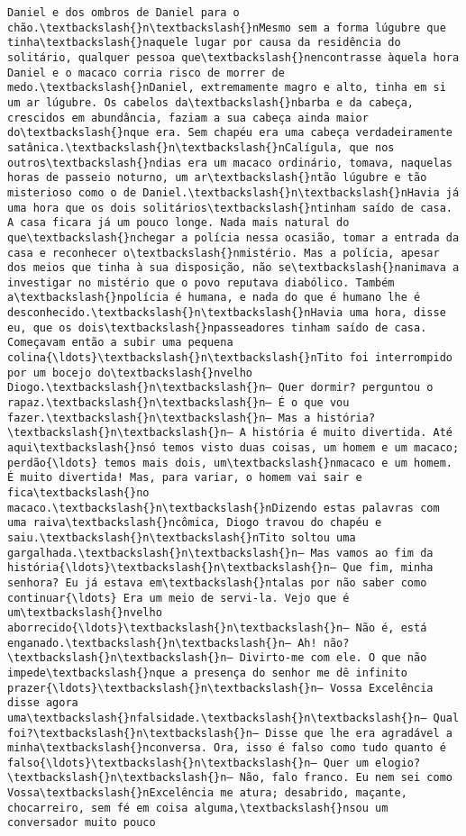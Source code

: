 \documentclass[11pt]{article}
\begin{document}
\begin{Verbatim}[commandchars=\\\{\}]
Daniel e dos ombros de Daniel para o chão.\textbackslash{}n\textbackslash{}nMesmo sem a forma lúgubre que tinha\textbackslash{}naquele lugar por causa da residência do solitário, qualquer pessoa que\textbackslash{}nencontrasse àquela hora Daniel e o macaco corria risco de morrer de medo.\textbackslash{}nDaniel, extremamente magro e alto, tinha em si um ar lúgubre. Os cabelos da\textbackslash{}nbarba e da cabeça, crescidos em abundância, faziam a sua cabeça ainda maior do\textbackslash{}nque era. Sem chapéu era uma cabeça verdadeiramente satânica.\textbackslash{}n\textbackslash{}nCalígula, que nos outros\textbackslash{}ndias era um macaco ordinário, tomava, naquelas horas de passeio noturno, um ar\textbackslash{}ntão lúgubre e tão misterioso como o de Daniel.\textbackslash{}n\textbackslash{}nHavia já uma hora que os dois solitários\textbackslash{}ntinham saído de casa. A casa ficara já um pouco longe. Nada mais natural do que\textbackslash{}nchegar a polícia nessa ocasião, tomar a entrada da casa e reconhecer o\textbackslash{}nmistério. Mas a polícia, apesar dos meios que tinha à sua disposição, não se\textbackslash{}nanimava a investigar no mistério que o povo reputava diabólico. Também a\textbackslash{}npolícia é humana, e nada do que é humano lhe é desconhecido.\textbackslash{}n\textbackslash{}nHavia uma hora, disse eu, que os dois\textbackslash{}npasseadores tinham saído de casa. Começavam então a subir uma pequena colina{\ldots}\textbackslash{}n\textbackslash{}nTito foi interrompido por um bocejo do\textbackslash{}nvelho Diogo.\textbackslash{}n\textbackslash{}n— Quer dormir? perguntou o rapaz.\textbackslash{}n\textbackslash{}n— É o que vou fazer.\textbackslash{}n\textbackslash{}n— Mas a história?\textbackslash{}n\textbackslash{}n— A história é muito divertida. Até aqui\textbackslash{}nsó temos visto duas coisas, um homem e um macaco; perdão{\ldots} temos mais dois, um\textbackslash{}nmacaco e um homem. É muito divertida! Mas, para variar, o homem vai sair e fica\textbackslash{}no macaco.\textbackslash{}n\textbackslash{}nDizendo estas palavras com uma raiva\textbackslash{}ncômica, Diogo travou do chapéu e saiu.\textbackslash{}n\textbackslash{}nTito soltou uma gargalhada.\textbackslash{}n\textbackslash{}n— Mas vamos ao fim da história{\ldots}\textbackslash{}n\textbackslash{}n— Que fim, minha senhora? Eu já estava em\textbackslash{}ntalas por não saber como continuar{\ldots} Era um meio de servi-la. Vejo que é um\textbackslash{}nvelho aborrecido{\ldots}\textbackslash{}n\textbackslash{}n— Não é, está enganado.\textbackslash{}n\textbackslash{}n— Ah! não?\textbackslash{}n\textbackslash{}n— Divirto-me com ele. O que não impede\textbackslash{}nque a presença do senhor me dê infinito prazer{\ldots}\textbackslash{}n\textbackslash{}n— Vossa Excelência disse agora uma\textbackslash{}nfalsidade.\textbackslash{}n\textbackslash{}n— Qual foi?\textbackslash{}n\textbackslash{}n— Disse que lhe era agradável a minha\textbackslash{}nconversa. Ora, isso é falso como tudo quanto é falso{\ldots}\textbackslash{}n\textbackslash{}n— Quer um elogio?\textbackslash{}n\textbackslash{}n— Não, falo franco. Eu nem sei como Vossa\textbackslash{}nExcelência me atura; desabrido, maçante, chocarreiro, sem fé em coisa alguma,\textbackslash{}nsou um conversador muito pouco 
\end{Verbatim}
\end{document}
